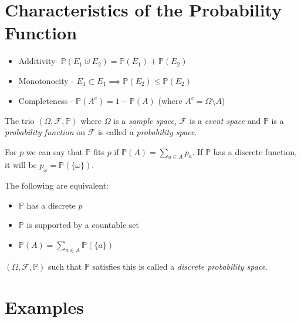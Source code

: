 \documentclass[00_complete]{subfiles}
\begin{document}
\section{Characteristics of the Probability Function}
\begin{itemize}
    \item Additivity- $\mathbb{P}(E_1 \cupdot E_2) = \mathbb{P}(E_1) +
        \mathbb{P}(E_2)$
    \item Monotonocity - $E_1 \subset E_1 \implies \mathbb{P}(E_2) \leq
        \mathbb{P}(E_2)$
    \item Completeness - $\mathbb{P}(A^c) = 1-\mathbb{P}(A)$ (where $A^c=\Omega
        \setminus A$)
\end{itemize}
The trio $(\Omega, \mathcal F, \mathbb{P})$ where $\Omega$ is a \emph{sample
space}, $\mathcal F$ is a \emph{event space} and $\mathbb{P}$ is a
\emph{probability function} on $\mathcal F$ is called a \emph{probability
space}.
\begin{definition}
    For $p$ we can say that $\mathbb{P}$ fits $p$ if $\mathbb{P}(A)=
    \sum\limits_{a\in A}p_a$. If $\mathbb{P}$ has a discrete function, it will
    be $p_\omega=\mathbb{P}(\{\omega\})$.
\end{definition}
\begin{claim}
    The following are equivalent:
    \begin{itemize}
        \item $\mathbb{P}$ has a discrete $p$
        \item $\mathbb{P}$ is supported by a countable set
        \item $\mathbb{P}(A)=\sum\limits_{a \in A}\mathbb{P}(\{a\})$
    \end{itemize}
    $(\Omega, \mathcal F, \mathbb{P})$ such that $\mathbb{P}$ satisfies this is
    called a \emph{discrete probability space}.
\end{claim}
\section{Examples}
\end{document}
